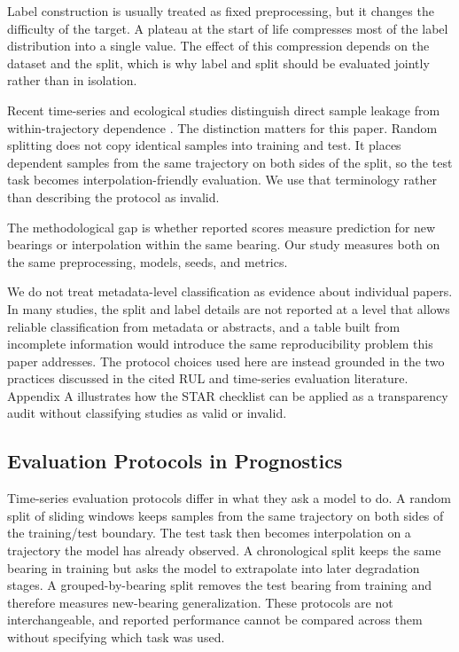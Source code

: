 \documentclass[pdflatex,sn-mathphys-num]{sn-jnl}
\begin{document}
Label construction is usually treated as fixed preprocessing, but it changes the difficulty of the target. A plateau at the start of life compresses most of the label distribution into a single value. The effect of this compression depends on the dataset and the split, which is why label and split should be evaluated jointly rather than in isolation.

Recent time-series and ecological studies distinguish direct sample leakage from within-trajectory dependence \cite{leakage_nature,leakage_frontiers}. The distinction matters for this paper. Random splitting does not copy identical samples into training and test. It places dependent samples from the same trajectory on both sides of the split, so the test task becomes interpolation-friendly evaluation. We use that terminology rather than describing the protocol as invalid.

The methodological gap is whether reported scores measure prediction for new bearings or interpolation within the same bearing. Our study measures both on the same preprocessing, models, seeds, and metrics.

We do not treat metadata-level classification as evidence about individual papers. In many studies, the split and label details are not reported at a level that allows reliable classification from metadata or abstracts, and a table built from incomplete information would introduce the same reproducibility problem this paper addresses. The protocol choices used here are instead grounded in the two practices discussed in the cited RUL and time-series evaluation literature. Appendix A illustrates how the STAR checklist can be applied as a transparency audit without classifying studies as valid or invalid.

\subsection{Evaluation Protocols in Prognostics}
Time-series evaluation protocols differ in what they ask a model to do. A random split of sliding windows keeps samples from the same trajectory on both sides of the training/test boundary. The test task then becomes interpolation on a trajectory the model has already observed. A chronological split keeps the same bearing in training but asks the model to extrapolate into later degradation stages. A grouped-by-bearing split removes the test bearing from training and therefore measures new-bearing generalization. These protocols are not interchangeable, and reported performance cannot be compared across them without specifying which task was used.
\end{document}
